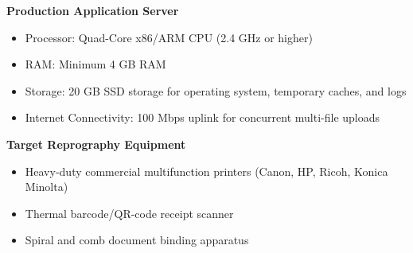 \documentclass[12pt,a4paper]{report}
\begin{document}
\noindent\textbf{Production Application Server}
\begin{itemize}[leftmargin=0.35in, itemsep=2pt]
  \item Processor: Quad-Core x86/ARM CPU (2.4 GHz or higher)
  \item RAM: Minimum 4 GB RAM
  \item Storage: 20 GB SSD storage for operating system, temporary caches, and logs
  \item Internet Connectivity: 100 Mbps uplink for concurrent multi-file uploads
\end{itemize}

\noindent\textbf{Target Reprography Equipment}
\begin{itemize}[leftmargin=0.35in, itemsep=2pt]
  \item Heavy-duty commercial multifunction printers (Canon, HP, Ricoh, Konica Minolta)
  \item Thermal barcode/QR-code receipt scanner
  \item Spiral and comb document binding apparatus
\end{itemize}
\end{document}
